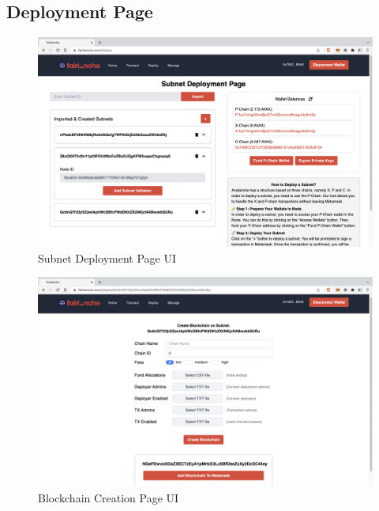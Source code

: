 \documentclass[a4paper,12pt]{report}
\begin{document}
\subsection{Deployment Page}
\begin{figure}[H]
	\centering
	\includegraphics[width=1\textwidth]{ss2.png}
	\caption{Subnet Deployment Page UI}
\end{figure}
\begin{figure}[H]
	\centering
	\includegraphics[width=1\textwidth]{ss3.png}
	\caption{Blockchain Creation Page UI}
\end{figure}
\end{document}
